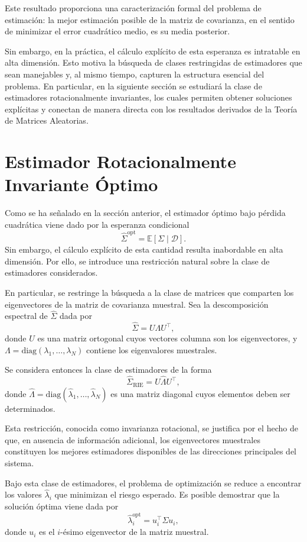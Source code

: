 \documentclass[letterpaper,12pt,oneside]{book}
\begin{document}
Este resultado proporciona una caracterización formal del problema de estimación: la mejor estimación posible de la matriz de covarianza, en el sentido de minimizar el error cuadrático medio, es su media posterior.

Sin embargo, en la práctica, el cálculo explícito de esta esperanza es intratable en alta dimensión. Esto motiva la búsqueda de clases restringidas de estimadores que sean manejables y, al mismo tiempo, capturen la estructura esencial del problema. En particular, en la siguiente sección se estudiará la clase de estimadores rotacionalmente invariantes, los cuales permiten obtener soluciones explícitas y conectan de manera directa con los resultados derivados de la Teoría de Matrices Aleatorias.

\section{Estimador Rotacionalmente Invariante Óptimo}

Como se ha señalado en la sección anterior, el estimador óptimo bajo pérdida cuadrática viene dado por la esperanza condicional
\[
\widehat{\Sigma}^{\text{opt}} = \mathbb{E}[\Sigma \mid \mathcal{D}].
\]
Sin embargo, el cálculo explícito de esta cantidad resulta inabordable en alta dimensión. Por ello, se introduce una restricción natural sobre la clase de estimadores considerados.

En particular, se restringe la búsqueda a la clase de matrices que comparten los eigenvectores de la matriz de covarianza muestral. Sea la descomposición espectral de $\widehat{\Sigma}$ dada por
\[
\widehat{\Sigma} = U \Lambda U^\top,
\]
donde $U$ es una matriz ortogonal cuyos vectores columna son los eigenvectores, y $\Lambda = \mathrm{diag}(\lambda_1, \dots, \lambda_N)$ contiene los eigenvalores muestrales.

Se considera entonces la clase de estimadores de la forma
\[
\widehat{\Sigma}_{\text{RIE}} = U \widehat{\Lambda} U^\top,
\]
donde $\widehat{\Lambda} = \mathrm{diag}(\widehat{\lambda}_1, \dots, \widehat{\lambda}_N)$ es una matriz diagonal cuyos elementos deben ser determinados.

Esta restricción, conocida como invarianza rotacional, se justifica por el hecho de que, en ausencia de información adicional, los eigenvectores muestrales constituyen los mejores estimadores disponibles de las direcciones principales del sistema.

Bajo esta clase de estimadores, el problema de optimización se reduce a encontrar los valores $\widehat{\lambda}_i$ que minimizan el riesgo esperado. Es posible demostrar que la solución óptima viene dada por
\[
\widehat{\lambda}_i^{\text{opt}} = u_i^\top \Sigma u_i,
\]
donde $u_i$ es el $i$-ésimo eigenvector de la matriz muestral.
\end{document}
